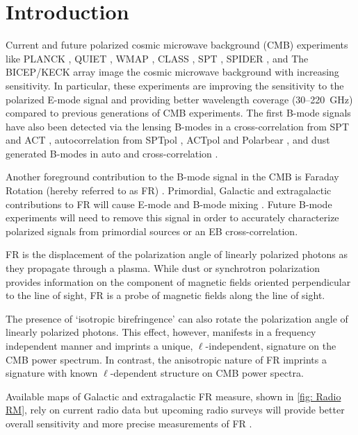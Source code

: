 \documentclass[usenatbib,hidelinks]{mnras}
\begin{document}
\section{Introduction}\label{sec:intro}{
 Current and future polarized cosmic microwave background (CMB) experiments like 
PLANCK \citep{planck:2015i}, 
QUIET \citep{quiet_instrument}, 
WMAP \citep{wmap:2013}, 
CLASS \citep{class:2014}, 
SPT \citep{spt3g:2014}, 
SPIDER \citep{spider:2013}, 
and The BICEP/KECK array \citep{bicep_keck:2014,bicepbmode:2015} image the cosmic microwave background with increasing sensitivity.
 In particular, these experiments are improving the sensitivity to the polarized E-mode signal and providing better wavelength coverage (30--220~GHz) compared to previous generations of CMB experiments.
  The first B-mode signals have also been detected via 
 the lensing B-modes in a cross-correlation from 
 SPT \citep{sptbmode:2013} and ACT \citep{actbmode:2015}, 
 autocorrelation from SPTpol \citep{keisler:2015}, 
 ACTpol \citep{Naess:2014} and Polarbear \citep{polarbear:2014}, 
 and dust generated B-modes in auto and cross-correlation \citep{bicepbmode:2015,planck_bicep:2015}. 

  Another foreground contribution to the B-mode signal in the CMB is Faraday Rotation (hereby referred to as FR) \citep{scoccola:2004,tashiro:2008}. Primordial, Galactic and extragalactic contributions to FR will cause E-mode and B-mode mixing \citep{Gluscevic:2009}. Future B-mode experiments will need to remove this signal in order to accurately characterize polarized signals from primordial sources or an EB cross-correlation.  
 
 FR is the displacement of the polarization angle of linearly polarized photons as they propagate through a plasma.
  While dust or synchrotron polarization provides information on the component of magnetic fields oriented perpendicular to the line of sight, FR is a probe of magnetic fields along the line of sight.
  
 The presence of `isotropic birefringence' can also rotate the polarization angle of linearly polarized photons. 
This effect, however, manifests in a frequency independent manner and imprints a unique, $\ell$-independent, signature on the CMB power spectrum. 
In contrast, the anisotropic nature of FR imprints a signature with known $\ell$-dependent structure on CMB power spectra.  \citep{lue:1999,gruppuso:2016} 
    
  
  Available maps of Galactic and extragalactic FR measure, shown in \autoref{fig: Radio RM}, rely on current radio data \citep{Oppermann:2014} but upcoming radio surveys will provide better overall sensitivity and more precise measurements of FR \citep{bernardi:2013,sotomayor-beltran:2013,condon:2015,sotomayor-beltran:2015, wayth:2015, lenc:2016}.
  
}
\end{document}
